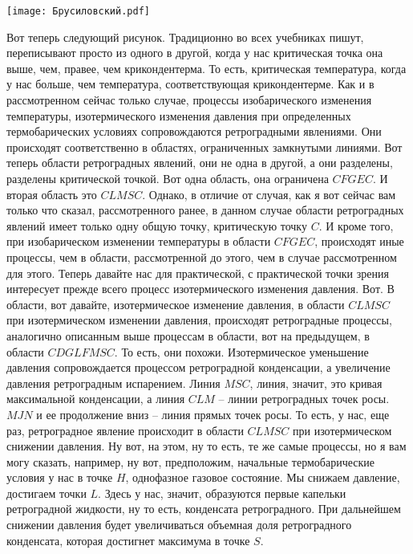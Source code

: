 \documentclass[main.tex]{subfiles}
\begin{document}
\begin{center}
\texttt{[image: Брусиловский.pdf]}
\end{center}

Вот теперь следующий рисунок.
Традиционно во всех учебниках пишут, переписывают просто из одного в другой, когда у нас критическая точка она выше, чем, правее, чем крикондентерма.
То есть, критическая температура, когда у нас больше, чем
температура, соответствующая крикондентерме.
Как и в рассмотренном сейчас только случае, процессы изобарического изменения температуры, изотермического изменения давления при определенных термобарических условиях сопровождаются ретроградными явлениями.
Они происходят соответственно в областях, ограниченных
замкнутыми линиями.
Вот теперь области ретроградных явлений, они не одна в другой, а они разделены, разделены критической точкой.
Вот одна область, она ограничена $CFGEC$.
И вторая область это $CLMSC$.
Однако, в отличие от случая, как я вот сейчас вам только
что сказал, рассмотренного ранее, в данном случае области
ретроградных явлений имеет только одну общую точку,
критическую точку $C$.
И кроме того, при изобарическом изменении температуры в области $CFGEC$, происходят иные процессы, чем в области, рассмотренной до этого, чем в случае рассмотренном для этого.
Теперь давайте нас для практической, с практической точки зрения интересует прежде всего процесс изотермического изменения давления.
Вот.
В области, вот давайте, изотермическое изменение давления, в области $CLMSC$ при изотермическом изменении давления, происходят ретроградные процессы, аналогично описанным выше процессам в области, вот на предыдущем, в области $CDGLFMSC$.
То есть, они похожи.
Изотермическое уменьшение давления сопровождается процессом ретроградной конденсации, а увеличение давления ретроградным испарением.
Линия $MSC$, линия, значит, это кривая максимальной конденсации, а линия $CLM$ -- линии ретроградных точек росы.
$MJN$ и ее продолжение вниз -- линия прямых точек росы.
То есть, у нас, еще раз, ретроградное явление происходит в области $CLMSC$ при изотермическом снижении давления.
Ну вот, на этом, ну то есть, те же самые процессы, но
я вам могу сказать, например, ну вот, предположим, начальные термобарические условия у нас в точке $H$, однофазное газовое состояние.
Мы снижаем давление, достигаем точки $L$.
Здесь у нас, значит, образуются первые капельки ретроградной жидкости, ну то есть, конденсата ретроградного.
При дальнейшем снижении давления будет увеличиваться объемная доля ретроградного конденсата, которая достигнет максимума в точке $S$.
\end{document}
